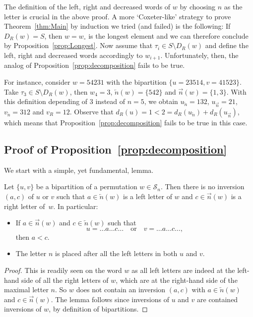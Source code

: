 \documentclass[Unicode]{cedram-alco}
\theoremstyle{definition}
\newcommand{\Sym}[1]{\mathcal{S}_{#1}}
\newcommand{\Symn}{\Sym{n}}
\newcommand{\R}{{\overrightarrow{n}}}
\newcommand{\LL}{{\overleftarrow{n}}}
\newcommand{\dd}{d_R}
\begin{document}
\begin{remark} The definition of the left, right and decreased words of $w$ by choosing $n$ as the letter is crucial in the above proof. A more `Coxeter-like' strategy to prove Theorem~\ref{thm:Main} by induction we tried (and failed) is the following:  If $D_R(w)=S$, then $w=w_\circ$ is the longest element and we can therefore conclude by Proposition~\ref{prop:Longest}. Now assume that $\tau_i\in S\setminus D_R(w)$ and define  the left, right and decreased words accordingly to $w_{i+1}$. Unfortunately, then, the analog of Proposition~\ref{prop:decomposition} fails to be true.

 For instance, consider $w=54231$ with the bipartition $\{ u=23514,v=41523\}$. Take $\tau_3\in S\setminus D_R(w)$, then $w_4=3$, $\LL(w)=\{542\}$ and $\R(w)=\{1,3\}$. With this definition depending of $3$ instead of $n=5$, we obtain $u_\LL = 132$, $u_\R=21$, $v_\LL=312$ and $v_R=12$. Observe that $\dd(u)=1<2=d_R(u_\LL)+d_R(u_\R)$, which means that Proposition~\ref{prop:decomposition} fails to be true in this case. 
\end{remark}


\subsection{Proof of Proposition~\ref{prop:decomposition}}

We start with a simple, yet fundamental, lemma.

\begin{lemm}
\label{lem:right-left-inversions}\label{rem:n-after}
Let $\lbrace u, v \rbrace$ be a bipartition of a permutation $w \in \Symn$. Then there is no inversion $(a,c)$ of $u$ or $v$ such that $a\in \LL(w)$ is a left letter of $w$ and $c\in\R(w)$ is a right letter of~$w$.
In particular:
\begin{itemize}
\item If $a\in\R(w)$ and $c \in \LL(w)$ such that 
$$
u=\dots a\dots c\dots\quad \textrm{or}\quad v=\dots a\dots c\dots,
$$ 
then $a<c$.
\item The letter $n$ is placed after all the left letters in both $u$ and $v$.
\end{itemize}
\end{lemm} 

\begin{proof}
This is readily seen  on the word $w$ as all left letters are indeed at the left-hand side of all the right letters of $w$, which are at the right-hand side of the maximal letter $n$. So $w$ does not contain an inversion $(a,c)$ with $a \in \LL(w)$ and $c \in \R(w)$. The lemma follows since inversions of $u$ and $v$ are contained  inversions of $w$, by definition of bipartitions.
\end{proof}
\end{document}
